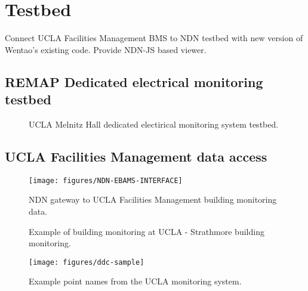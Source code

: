 \section{Testbed}

Connect UCLA Facilities Management BMS to NDN testbed with new version of Wentao’s existing code. Provide NDN-JS based viewer. 

\subsection{REMAP Dedicated electrical monitoring testbed}

\begin{figure}
\centering
{}
\caption{UCLA Melnitz Hall dedicated electirical monitoring system testbed.}
\label{fig:melnitz}
\end{figure}


\subsection{UCLA Facilities Management data access}

\begin{figure*}
\begin{center}
\texttt{[image: figures/NDN-EBAMS-INTERFACE]}
\caption{{NDN gateway to UCLA Facilities Management building monitoring data.}}
\label{fig:ucla-ebams-testbed}
\end{center}
\end{figure*}


\begin{figure}
\centering
{}
\caption{Example of building monitoring at UCLA - Strathmore building monitoring.}
\label{fig:strathmore}
\end{figure}

\begin{figure*}
\begin{center}
\texttt{[image: figures/ddc-sample]}
\caption{{Example point names from the UCLA monitoring system.}}
\label{fig:ddc-sample}
\end{center}
\end{figure*}





